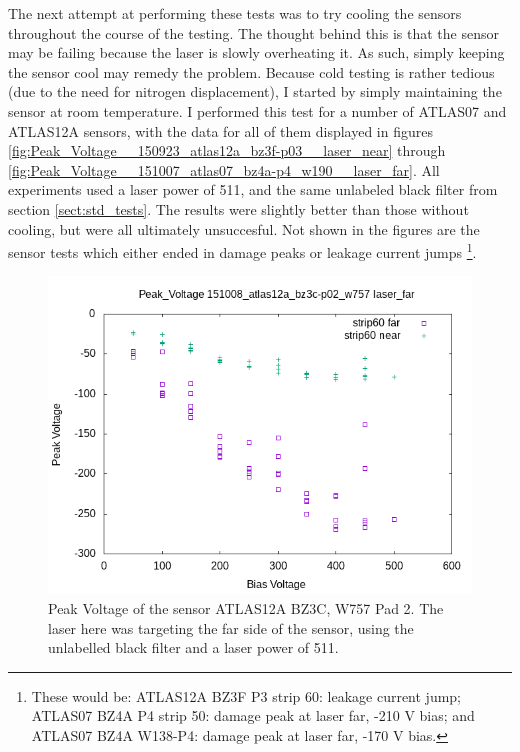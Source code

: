 \documentclass{report}
\begin{document}
            The next attempt at performing these tests was to try cooling the sensors throughout the course of the testing. The thought behind this is that the sensor may be failing because the laser is slowly overheating it. As such, simply keeping the sensor cool may remedy the problem. Because cold testing is rather tedious (due to the need for nitrogen displacement), I started by simply maintaining the sensor at room temperature. I performed this test for a number of ATLAS07 and ATLAS12A sensors, with the data for all of them displayed in figures \ref{fig:Peak_Voltage__150923_atlas12a_bz3f-p03__laser_near} through \ref{fig:Peak_Voltage__151007_atlas07_bz4a-p4_w190__laser_far}. All experiments used a laser power of 511, and the same unlabeled black filter from section \ref{sect:std_tests}. The results were slightly better than those without cooling, but were all ultimately unsuccesful. Not shown in the figures are the sensor tests which either ended in damage peaks or leakage current jumps \footnote{These would be: ATLAS12A BZ3F P3 strip 60: leakage current jump; ATLAS07 BZ4A P4 strip 50: damage peak at laser far, -210 V bias; and ATLAS07 BZ4A W138-P4: damage peak at laser far, -170 V bias.}.

            \begin{figure}[h] 
                \includegraphics[height=.4\textheight]{Peak_Voltage__151008_atlas12a_bz3c-p02_w757__laser_far}
                \centering
                \caption{ Peak Voltage of the sensor ATLAS12A BZ3C, W757 Pad 2. The laser here was targeting the far side of the sensor, using the unlabelled black filter and a laser power of 511. }
                \label{fig:Peak_Voltage__151008_atlas12a_bz3c-p02_w757__laser_far}
            \end{figure}
\end{document}
